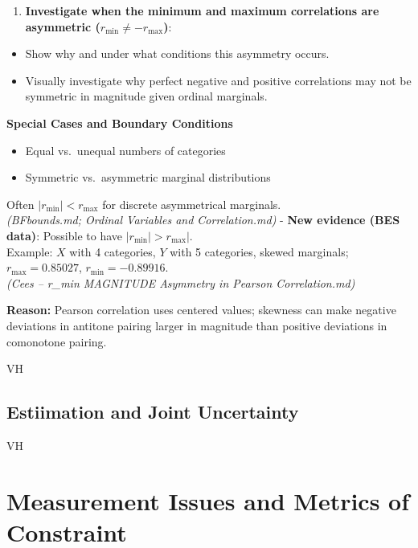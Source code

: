 \documentclass[
  12pt,
]{article}
\providecommand{\tightlist}{%
  \setlength{\itemsep}{0pt}\setlength{\parskip}{0pt}}
\theoremstyle{plain}
\theoremstyle{definition}
\theoremstyle{remark}
\begin{document}
\begin{enumerate}
\def\labelenumi{\arabic{enumi}.}
\setcounter{enumi}{3}
\tightlist
\item
  \textbf{Investigate when the minimum and maximum correlations are
  asymmetric (\(r_{\text{min}} \neq -r_{\text{max}}\))}:
\end{enumerate}

\begin{itemize}
\tightlist
\item
  Show why and under what conditions this asymmetry occurs.
\item
  Visually investigate why perfect negative and positive correlations
  may not be symmetric in magnitude given ordinal marginals.
\end{itemize}

\textbf{Special Cases and Boundary Conditions}

\begin{itemize}
\tightlist
\item
  Equal vs.~unequal numbers of categories\\
\item
  Symmetric vs.~asymmetric marginal distributions
\end{itemize}

Often \(|r_{\min}| < r_{\max}\) for discrete asymmetrical marginals.\\
\emph{(BFbounds.md; Ordinal Variables and Correlation.md)} - \textbf{New
evidence (BES data)}: Possible to have \(|r_{\min}| > r_{\max}|\).\\
Example: \(X\) with 4 categories, \(Y\) with 5 categories, skewed
marginals;\\
\(r_{\max} = 0.85027\), \(r_{\min} = -0.89916\).\\
\emph{(Cees -- r\_min MAGNITUDE Asymmetry in Pearson Correlation.md)}

\textbf{Reason:} Pearson correlation uses centered values; skewness can
make negative deviations in antitone pairing larger in magnitude than
positive deviations in comonotone pairing.

VH

\subsection{Estiimation and Joint
Uncertainty}\label{estiimation-and-joint-uncertainty}

VH

\section{Measurement Issues and Metrics of
Constraint}\label{measurement-issues-and-metrics-of-constraint}
\end{document}
